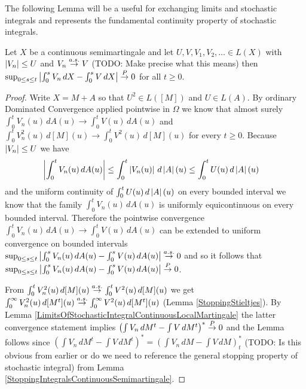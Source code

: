The following Lemma will be a useful for exchanging limits and stochastic integrals and represents the fundamental continuity property of stochastic integrals.
\begin{lem}\label{DominatedConvergenceContinuousSemimartingale}Let $X$ be a continuous semimartingale and let $U, V, V_1, V_2, \dotsc \in L(X)$ with $\left \vert V_n \right \vert \leq U$ and $V_n \overset{a.s.}\to V$ (TODO: Make precise what this means) then $\sup_{0 \leq s \leq t} \left \vert \int_0^s V_n \, dX - \int_0^s V \, dX \right \vert \overset{P}\to 0$ for all $t \geq 0$.
\end{lem}
\begin{proof}
Write $X = M + A$ so that $U^2 \in L([M])$ and $U \in L(A)$.  By ordinary Dominated Convergence applied pointwise in $\Omega$ we know that almost surely $\int_0^t V_n(u) \, dA(u) \to \int_0^t V(u) \, dA(u)$ and $\int_0^t V_n^2(u) \, d[M](u) \to \int_0^t V^2(u) \, d[M](u)$ for every $t \geq 0$.  Because $\left \vert V_n \right \vert \leq U$ we have
\begin{align*}
\left \vert \int_0^t V_n(u) \, dA(u) \right \vert &\leq \int_0^t \left \vert V_n(u) \right \vert \, d\left \vert A \right \vert(u) \leq \int_0^t U(u) \, d\left \vert A \right \vert(u)
\end{align*}
and the uniform continuity of $\int_0^t U(u) \, d\left \vert A \right \vert(u)$ on every bounded interval we know that the family $\int_0^t V_n(u) \, dA(u)$ is uniformly equicontinuous on every bounded interval.  Therefore the pointwise convergence $\int_0^t V_n(u) \, dA(u) \to \int_0^t V(u) \, dA(u)$ can be extended to uniform convergence on bounded intervals $\sup_{0 \leq s \leq t} \left \vert \int_0^s V_n(u) \, dA(u) - \int_0^s V(u) \, dA(u) \right \vert \overset{a.s.}\to 0$ and so it follows that $\sup_{0 \leq s \leq t} \left \vert \int_0^s V_n(u) \, dA(u) - \int_0^s V(u) \, dA(u) \right \vert \overset{P}\to 0$.

From $\int_0^t V_n^2(u) \, d[M](u) \overset{a.s.}\to \int_0^t V^2(u) \, d[M](u)$ we get $\int_0^\infty V_n^2(u) \, d[M^t](u) \overset{a.s.}\to \int_0^\infty V^2(u) \, d[M^t](u)$ (Lemma \ref{StoppingStieltjes}).  By Lemma \ref{LimitsOfStochasticIntegralContinuousLocalMartingale} the latter convergence statement implies $\left(\int V_n \, dM^t  - \int V \, dM^t\right)^* \overset{P}\to 0$ and the Lemma follows since $\left(\int V_n \, dM^t  - \int V \, dM^t\right)^* = \left(\int V_n \, dM  - \int V \, dM\right)_t^*$ (TODO: Is this obvious from earlier or do we need to reference the general stopping property of stochastic integral) from Lemma \ref{StoppingIntegralsContinuousSemimartingale}.
\end{proof}

